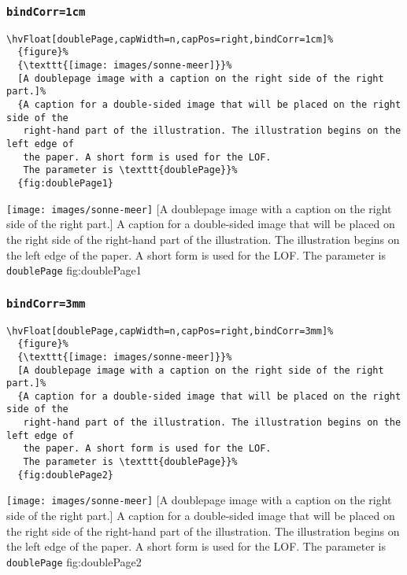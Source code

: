 \documentclass[twoside]{scrartcl}
\makeatletter
\let\hvBlindtext\Blindtext
\def\Blindtext{\par\color{black!40}\hvBlindtext\par\normalcolor}
\def\hvblindtext{\textcolor{black!40}{\blindtext@text}}
\makeatother
\begin{document}
\subsubsection{\texttt{bindCorr=1cm}}

\begin{lstlisting}
\hvFloat[doublePage,capWidth=n,capPos=right,bindCorr=1cm]%
  {figure}%
  {\texttt{[image: images/sonne-meer]}}%
  [A doublepage image with a caption on the right side of the right part.]%
  {A caption for a double-sided image that will be placed on the right side of the
   right-hand part of the illustration. The illustration begins on the left edge of 
   the paper. A short form is used for the LOF. 
   The parameter is \texttt{doublePage}}%
  {fig:doublePage1}
\end{lstlisting}

%
  {\texttt{[image: images/sonne-meer]}}%
  [A doublepage image with a caption on the right side of the right part.]%
  {A caption for a double-sided image that will be placed on the right side of the
   right-hand part of the illustration. The illustration begins on the left edge of 
   the paper. A short form is used for the LOF. 
   The parameter is \texttt{doublePage}}%
  {fig:doublePage1}

\hvblindtext

\Blindtext

\Blindtext

\Blindtext

\subsubsection{\texttt{bindCorr=3mm}}
\begin{lstlisting}
\hvFloat[doublePage,capWidth=n,capPos=right,bindCorr=3mm]%
  {figure}%
  {\texttt{[image: images/sonne-meer]}}%
  [A doublepage image with a caption on the right side of the right part.]%
  {A caption for a double-sided image that will be placed on the right side of the
   right-hand part of the illustration. The illustration begins on the left edge of 
   the paper. A short form is used for the LOF. 
   The parameter is \texttt{doublePage}}%
  {fig:doublePage2}
\end{lstlisting}

%
  {\texttt{[image: images/sonne-meer]}}%
  [A doublepage image with a caption on the right side of the right part.]%
  {A caption for a double-sided image that will be placed on the right side of the
   right-hand part of the illustration. The illustration begins on the left edge of 
   the paper. A short form is used for the LOF. 
   The parameter is \texttt{doublePage}}%
  {fig:doublePage2}
\end{document}
